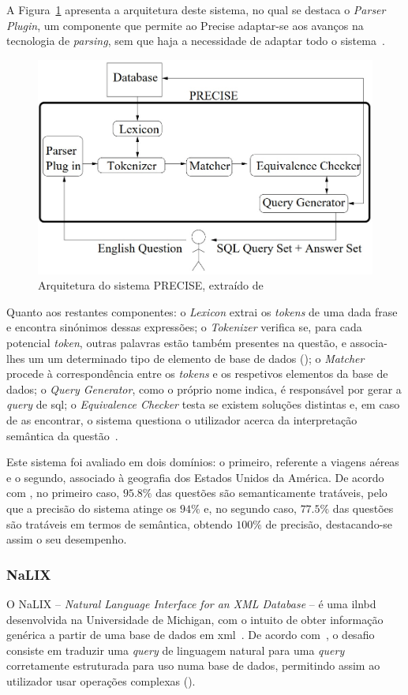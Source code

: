 A Figura~\ref{fig:precise_architecture} apresenta a arquitetura deste sistema, no qual se destaca o \textit{Parser Plugin}, um componente que permite ao Precise adaptar-se aos avanços na tecnologia de \textit{parsing}, sem que haja a necessidade de adaptar todo o sistema~\parencite{modern_nlidb_composing_statistical_parsing_semantic_tractability}. 
%
\begin{figure}
    \centering
    \includegraphics[width=.6\textwidth]{ch03/assets/precise_architecture.jpg}
    \caption{Arquitetura do sistema PRECISE, extraído de~\textcite{towards_theory_nli_databases}}
    \label{fig:precise_architecture}
\end{figure}
%
Quanto aos restantes componentes: o \textit{Lexicon} extrai os \textit{tokens} de uma dada frase e encontra sinónimos dessas expressões; o \textit{Tokenizer} verifica se, para cada potencial \textit{token}, outras palavras estão também presentes na questão, e associa-lhes um um determinado tipo de elemento de base de dados (); o \textit{Matcher} procede à correspondência entre os \textit{tokens} e os respetivos elementos da base de dados; o \textit{Query Generator}, como o próprio nome indica, é responsável por gerar a \textit{query} de \gls{sql}; o \textit{Equivalence Checker} testa se existem soluções distintas e, em caso de as encontrar, o sistema questiona o utilizador acerca da interpretação semântica da questão~\parencite{towards_theory_nli_databases}.

Este sistema foi avaliado em dois domínios: o primeiro, referente a viagens aéreas e o segundo, associado à geografia dos Estados Unidos da América. De acordo com \textcite{nlidb_brief_review}, no primeiro caso, $95.8\%$ das questões são semanticamente tratáveis, pelo que a precisão do sistema atinge os $94\%$ e, no segundo caso, $77.5\%$ das questões são tratáveis em termos de semântica, obtendo $100\%$ de precisão, destacando-se assim o seu desempenho.

\subsubsection*{NaLIX}
O NaLIX -- \textit{Natural Language Interface for an XML Database} -- é uma \gls{ilnbd} desenvolvida na Universidade de Michigan, com o intuito de obter informação genérica a partir de uma base de dados em \gls{xml}~\parencite{nalix_interactive_nli_querying_xml}. De acordo com~\textcite{nalix_interactive_nli_querying_xml}, o desafio consiste em traduzir uma \textit{query} de linguagem natural para uma \textit{query} corretamente estruturada para uso numa base de dados, permitindo assim ao utilizador usar operações complexas ().

